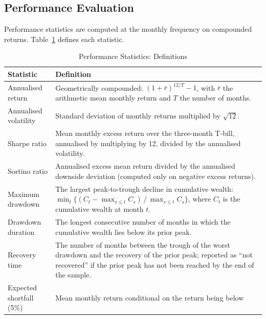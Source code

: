 \documentclass[12pt, a4paper]{article}
\begin{document}
\subsection{Performance Evaluation}

Performance statistics are computed at the monthly frequency on compounded returns.
Table~\ref{tab:stats_def} defines each statistic.

\begin{table}[H]
  \centering
  \caption{Performance Statistics: Definitions}
  \label{tab:stats_def}
  \small
  \begin{tabularx}{\textwidth}{lX}
    \toprule
    \textbf{Statistic} & \textbf{Definition} \\
    \midrule
    Annualised return       & Geometrically compounded: $(1+\bar{r})^{12/T}-1$, with
                              $\bar{r}$ the arithmetic mean monthly return and $T$ the
                              number of months. \\
    Annualised volatility   & Standard deviation of monthly returns multiplied by
                              $\sqrt{12}$. \\
    Sharpe ratio            & Mean monthly excess return over the three-month T-bill,
                              annualised by multiplying by 12, divided by the annualised
                              volatility. \\
    Sortino ratio           & Annualised excess mean return divided by the annualised
                              downside deviation (computed only on negative excess
                              returns). \\
    Maximum drawdown        & The largest peak-to-trough decline in cumulative wealth:
                              $\min_t \{ (C_t - \max_{s\leq t} C_s)\,/\,\max_{s\leq t} C_s \}$,
                              where $C_t$ is the cumulative wealth at month $t$. \\
    Drawdown duration       & The longest consecutive number of months in which the
                              cumulative wealth lies below its prior peak. \\
    Recovery time           & The number of months between the trough of the worst
                              drawdown and the recovery of the prior peak; reported as
                              ``not recovered'' if the prior peak has not been reached
                              by the end of the sample. \\
    Expected shortfall (5\%)& Mean monthly return conditional on the return being below

\end{tabularx}
\end{table}
\end{document}
